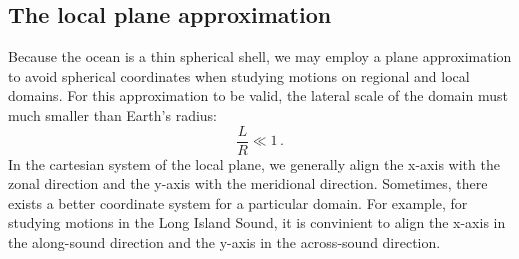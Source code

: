 \documentclass[11pt]{article}
\newcommand{\per}{\,.}
\def\beq{\begin{equation}}
\def\eeq{\end{equation}}
\begin{document}
\subsection{The local plane approximation}
Because the ocean is a thin spherical shell, we may employ a plane approximation to
avoid spherical coordinates when studying motions on regional and local domains. For this
approximation to be valid, the lateral scale of the domain must much smaller than Earth's radius:
\beq
\frac{L}{R} \ll 1\per
\eeq
In the cartesian system of the local plane, we generally align the x-axis with the zonal direction
and the y-axis with the meridional direction. Sometimes, there exists a better coordinate system
for a particular domain. For example, for studying motions in the Long Island Sound, it is convinient to align the x-axis in the along-sound direction and the y-axis in the across-sound direction.
\end{document}
